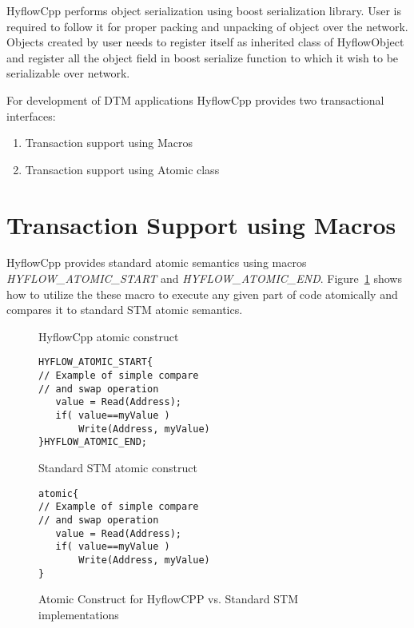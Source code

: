 \documentclass[12pt,english]{report}
\begin{document}
HyflowCpp performs object serialization using boost serialization library. User is required to follow it for proper packing and unpacking of object over the network. Objects created by user needs to register itself as inherited class of HyflowObject and register all the object field in boost serialize function to which it wish to be serializable over network.

For development of DTM applications HyflowCpp provides two transactional interfaces: 
\begin{enumerate}
\item Transaction support using Macros
\item Transaction support using Atomic class 
\end{enumerate}

\section{Transaction Support using Macros}

HyflowCpp provides standard atomic semantics using macros \emph{HYFLOW{\_}ATOMIC{\_}START} and \emph{HYFLOW{\_}ATOMIC{\_}END}. Figure~\ref{Fig:atomicConstr} shows how to utilize the these macro to execute any given part of code atomically and compares it to standard STM atomic semantics. 

\begin{figure}
\centering 
\begin{footnotesize}
\begin{minipage}[b]{0.45\linewidth}\centering
HyflowCpp atomic construct 
\begin{lstlisting}
HYFLOW_ATOMIC_START{
// Example of simple compare
// and swap operation
   value = Read(Address);
   if( value==myValue )
       Write(Address, myValue)
}HYFLOW_ATOMIC_END;
\end{lstlisting} 
\end{minipage} 
\begin{minipage}[b]{0.45\linewidth}\centering
Standard STM atomic construct
\begin{lstlisting}   					   
atomic{
// Example of simple compare
// and swap operation
   value = Read(Address);
   if( value==myValue )
       Write(Address, myValue)
}
\end{lstlisting}			  
\end{minipage}
\end{footnotesize}
\label{Fig:atomicConstr}\caption{Atomic Construct for HyflowCPP vs. Standard STM implementations}
\end{figure}
\end{document}
